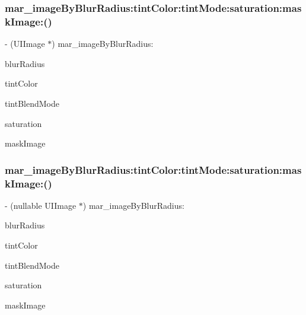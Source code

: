 \subsubsection{\texorpdfstring{mar\+\_\+image\+By\+Blur\+Radius\+:tint\+Color\+:tint\+Mode\+:saturation\+:mask\+Image\+:()}{mar\_imageByBlurRadius:tintColor:tintMode:saturation:maskImage:()}\hspace{0.1cm}{\footnotesize\ttfamily [1/2]}}
{\footnotesize\ttfamily -\/ (U\+I\+Image $\ast$) mar\+\_\+image\+By\+Blur\+Radius\+: \begin{DoxyParamCaption}\item[{(C\+G\+Float)}]{blur\+Radius }\item[{tintColor:(U\+I\+Color $\ast$)}]{tint\+Color }\item[{tintMode:(C\+G\+Blend\+Mode)}]{tint\+Blend\+Mode }\item[{saturation:(C\+G\+Float)}]{saturation }\item[{maskImage:(U\+I\+Image $\ast$)}]{mask\+Image }\end{DoxyParamCaption}\hspace{0.3cm}{\ttfamily [implementation]}}

\mbox{\label{category_u_i_image_07_m_a_r_e_x_08_aa079614cf36142dec53faca9418c0df0}} 
\subsubsection{\texorpdfstring{mar\+\_\+image\+By\+Blur\+Radius\+:tint\+Color\+:tint\+Mode\+:saturation\+:mask\+Image\+:()}{mar\_imageByBlurRadius:tintColor:tintMode:saturation:maskImage:()}\hspace{0.1cm}{\footnotesize\ttfamily [2/2]}}
{\footnotesize\ttfamily -\/ (nullable U\+I\+Image $\ast$) mar\+\_\+image\+By\+Blur\+Radius\+: \begin{DoxyParamCaption}\item[{(C\+G\+Float)}]{blur\+Radius }\item[{tintColor:(nullable U\+I\+Color $\ast$)}]{tint\+Color }\item[{tintMode:(C\+G\+Blend\+Mode)}]{tint\+Blend\+Mode }\item[{saturation:(C\+G\+Float)}]{saturation }\item[{maskImage:(nullable U\+I\+Image $\ast$)}]{mask\+Image }\end{DoxyParamCaption}}

